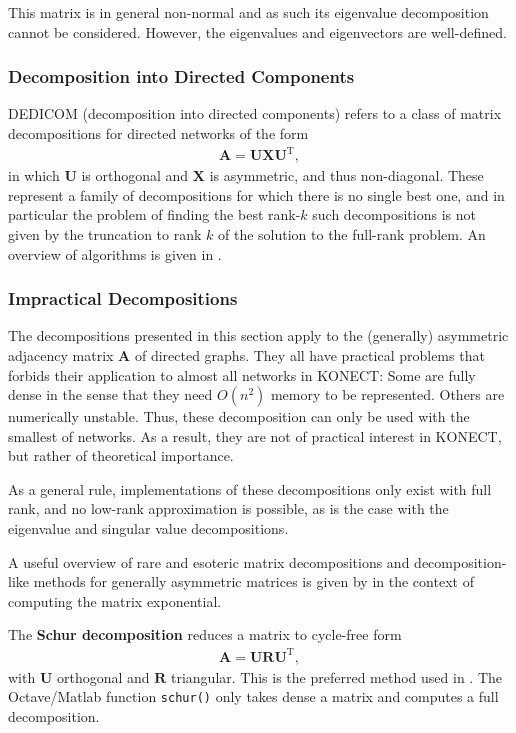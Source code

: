 \documentclass{article}
\begin{document}
This matrix is in general non-normal and as such its eigenvalue
decomposition cannot be considered.  However, the eigenvalues and
eigenvectors are well-defined. 

\subsubsection{Decomposition into Directed Components}
DEDICOM (decomposition into directed components) refers to a class of
matrix decompositions for directed networks of the form
\begin{align}
  \mathbf A = \mathbf U \mathbf X \mathbf U^{\mathrm T},
\end{align}
in which $\mathbf U$ is orthogonal and $\mathbf X$ is asymmetric, and
thus non-diagonal.  These represent a family of decompositions for which
there is no single best one, and in particular the problem of finding
the best rank-$k$ such decompositions is not given by the truncation to
rank $k$ of the solution to the full-rank problem.  An overview of
algorithms is given in \citep{kunegis:directed-decomposition}. 

\subsubsection{Impractical Decompositions}
The decompositions presented in this section apply to the (generally) asymmetric
adjacency matrix $\mathbf A$ of directed graphs.  
They all have practical problems that forbids their application to
almost all networks in KONECT: 
Some are fully dense in the sense that
they need $O(n^2)$ memory to be represented.  Others are numerically
unstable. 
Thus, these decomposition can only be used with the
smallest of networks.  As a result, they are not of practical interest
in KONECT, but rather of theoretical importance. 

As a general rule, implementations of these decompositions only exist
with full rank, and no low-rank approximation is possible, as is the
case with the eigenvalue and singular value decompositions. 

A useful overview of rare and esoteric matrix decompositions and
decomposition-like methods for generally asymmetric matrices is given by
\citep{b136} in the context of computing the matrix exponential. 

The \textbf{Schur decomposition}
 reduces a matrix to cycle-free form
\begin{align*}
  \mathbf A = \mathbf U \mathbf R \mathbf U^{\mathrm T},
\end{align*}
with $\mathbf U$ orthogonal and $\mathbf R$ triangular.  
This is the preferred method used in \citep{b136}. 
The Octave/Matlab function \texttt{schur()} only takes dense a matrix and
computes a full decomposition. 
\end{document}
